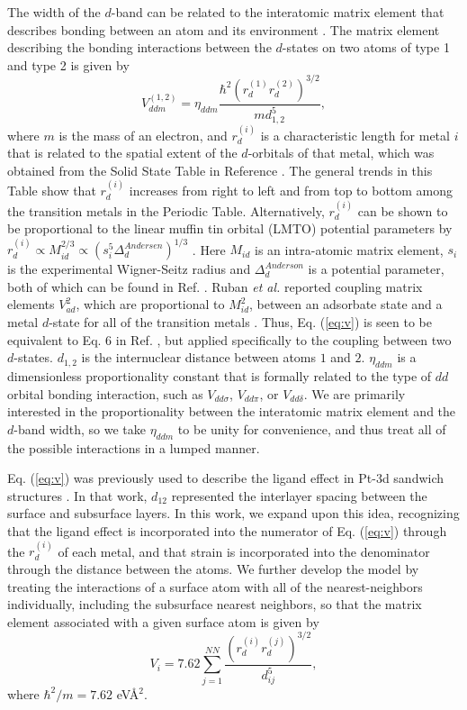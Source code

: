 \documentclass[aps,prl,twocolumn,superscriptaddress,showkeys]{revtex4}
\begin{document}
The width of the $d$-band can be related to the interatomic matrix
element that describes bonding between an atom and its environment
\cite{harrison1989}.  The matrix element describing the bonding
interactions between the $d$-states on two atoms
of type 1 and type 2 is given by
\cite{harrison1989}
%
\begin{equation}\label{eq:v}
V^{(1,2)}_{ddm}=\eta_{ddm}\frac{\hbar^2 (r_d^{(1)}r_d^{(2)})^{3/2}}{md_{1,2}^5},
\end{equation}
%
where $m$ is the mass of an electron, and $r_d^{(i)}$ is a
characteristic length for metal $i$ that is related to the spatial
extent of the $d$-orbitals of that metal, which was obtained from the
Solid State Table in Reference \citealp{harrison1989}.  The general
trends in this Table show that $r_d^{(i)}$ increases from right to
left and from top to bottom among the transition metals in the
Periodic Table.  Alternatively, $r_d^{(i)}$ can be shown to be
proportional to the linear muffin tin orbital (LMTO) potential
parameters by $r_d^{(i)} \propto M_{id}^{2/3} \propto (s_i^5
\Delta_d^{Andersen})^{1/3}$ \cite{jacobsen1987:_inter,
  ruban1997:_surfac}. Here $M_{id}$ is an intra-atomic matrix element,
$s_i$ is the experimental Wigner-Seitz radius and
$\Delta_d^{Anderson}$ is a potential parameter, both of which can be
found in Ref.  \cite{andersen1985:_canon_descr_band_struc_metal}.
Ruban \emph{et al.}  reported coupling matrix elements $V_{ad}^2$, which are
proportional to $M_{id}^2$, between an adsorbate state and a metal
$d$-state for all of the transition metals \cite{ruban1997:_surfac}.
Thus, Eq.  (\ref{eq:v}) is seen to be equivalent to Eq. 6 in Ref.
\citealp{ruban1997:_surfac}, but applied specifically to the coupling
between two $d$-states.  $d_{1,2}$ is the internuclear distance between
atoms $1$ and $2$.  $\eta_{ddm}$ is a dimensionless proportionality
constant that is formally related to the type of $dd$ orbital bonding
interaction, such as $V_{dd\sigma}$, $V_{dd\pi}$, or $V_{dd\delta}$.
We are primarily interested in the proportionality between the
interatomic matrix element and the $d$-band width, so we take
$\eta_{ddm}$ to be unity for convenience, and thus treat all of the
possible interactions in a lumped manner.

Eq.  (\ref{eq:v}) was previously used to describe the ligand effect in
Pt-3d sandwich structures
\cite{kitchin2004:_modif_surfac_elect_chemic_proper}. In that work,
$d_{12}$ represented the interlayer spacing between the surface and
subsurface layers. In this work, we expand upon this idea, recognizing
that the ligand effect is incorporated into the numerator of Eq.
(\ref{eq:v}) through the $r_d^{(i)}$ of each metal, and that strain is
incorporated into the denominator through the distance between the
atoms.  We further develop the model by treating the interactions of a
surface atom with all of the nearest-neighbors individually, including
the subsurface nearest neighbors, so that the matrix element
associated with a given surface atom is given by
%
\begin{equation}\label{eq:vij}
V_{i}=7.62\sum_{j=1}^{NN} \frac{(r_d^{(i)}r_d^{(j)})^{3/2}}{d_{ij}^5},
\end{equation}
%
where $\hbar^2/m=7.62$ eV\AA$^2$.
\end{document}
